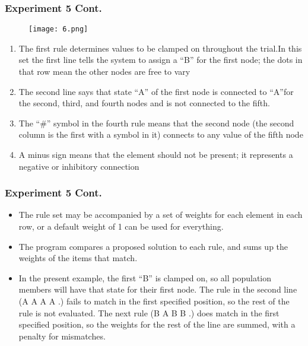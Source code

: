 \documentclass[CJK]{beamer}
\begin{document}
\begin{CJK*}{GBK}{song}
\begin{frame}
\frametitle{Experiment 5 Cont.}
\begin{center}
\begin{figure}
\texttt{[image: 6.png]}
\end{figure}
\end{center}
\begin{enumerate}
\item{The first rule determines values to be clamped on throughout the trial.In this set the first line tells the system to assign a “B” for the first node; the dots in that row mean the other nodes are free to vary}
\item{The second line says that state “A” of the first node is connected to “A”for the second, third, and fourth nodes and is not connected to the fifth.}
\item{The “\#” symbol in the fourth rule means that the second node (the second column is the first with a symbol in it) connects to any value of the fifth node}
\item{A minus sign means that the element should not be present; it represents a negative or inhibitory connection}
\end{enumerate}
\end{frame}

\begin{frame}
\frametitle{Experiment 5 Cont.}
\begin{itemize}
\item{The rule set may be accompanied by a set of weights for each element in each row, or a default weight of 1 can be used for everything.}
\item{The program compares a proposed solution to each rule, and sums up the weights of the items that
match.}
\item{In the present example, the first “B” is clamped on, so all population members will have that state for their first node. The rule in the second line (A A A A .) fails to match in the first specified position, so the rest of the rule is not evaluated. The next rule (B A B B .) does match in the first specified position, so the weights for the rest of the line are summed, with a penalty for mismatches.}
\end{itemize}
\end{frame}


\end{CJK*}
\end{document}
